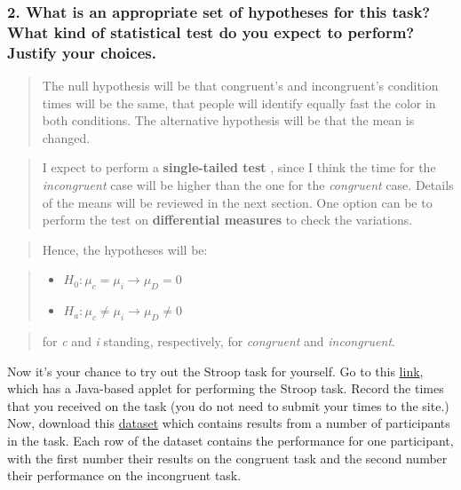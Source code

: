 \documentclass[]{article}
\providecommand{\tightlist}{%
  \setlength{\itemsep}{0pt}\setlength{\parskip}{0pt}}
\begin{document}
\subsubsection{2. What is an appropriate set of hypotheses for this
task? What kind of statistical test do you expect to perform? Justify
your
choices.}\label{what-is-an-appropriate-set-of-hypotheses-for-this-task-what-kind-of-statistical-test-do-you-expect-to-perform-justify-your-choices.}

\begin{quote}
The null hypothesis will be that congruent's and incongruent's condition
times will be the same, that people will identify equally fast the color
in both conditions. The alternative hypothesis will be that the mean is
changed.
\end{quote}

\begin{quote}
I expect to perform a \textbf{single-tailed test} , since I think the
time for the \emph{incongruent} case will be higher than the one for the
\emph{congruent} case. Details of the means will be reviewed in the next
section. One option can be to perform the test on \textbf{differential
measures} to check the variations.
\end{quote}

\begin{quote}
Hence, the hypotheses will be:
\end{quote}

\begin{quote}
\begin{itemize}
\tightlist
\item
  \(H_0 : \mu_{c} = \mu_{i} \rightarrow \mu_D =0\)
\item
  \(H_a : \mu_{c} \neq \mu_{i} \rightarrow \mu_D \neq 0\)
\end{itemize}
\end{quote}

\begin{quote}
for \emph{c} and \emph{i} standing, respectively, for \emph{congruent}
and \emph{incongruent}.
\end{quote}

Now it's your chance to try out the Stroop task for yourself. Go to this
\href{https://faculty.washington.edu/chudler/java/ready.html}{link},
which has a Java-based applet for performing the Stroop task. Record the
times that you received on the task (you do not need to submit your
times to the site.) Now, download this
\href{https://drive.google.com/file/d/0B9Yf01UaIbUgQXpYb2NhZ29yX1U/view?usp=sharing}{dataset}
which contains results from a number of participants in the task. Each
row of the dataset contains the performance for one participant, with
the first number their results on the congruent task and the second
number their performance on the incongruent task.
\end{document}
